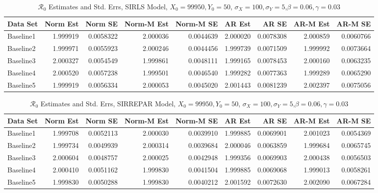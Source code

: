 \documentclass[12pt]{article}
\newcommand{\rr}{\ensuremath{\mathcal{R}_0}}
\begin{document}
\begin{table}[H]
	
	\caption{\label{tab:}$\rr$ Estimates and Std. Errs, SIRLS Model,
		$X_0 = 99950, Y_0 = 50$, $\sigma_X = 100, \sigma_Y = 5$,$\beta = 0.06, \gamma = 0.03$}
	\centering
	\begin{footnotesize}
	\begin{tabular}[t]{l|r|r|r|r|r|r|r|r}
		\hline
		Data Set & Norm Est & Norm SE & Norm-M Est & Norm-M SE & AR Est & AR SE & AR-M Est & AR-M SE\\
		\hline
		Baseline1 & 1.999919 & 0.0058322 & 2.000036 & 0.0044639 & 2.000020 & 0.0078308 & 2.000859 & 0.0060766\\
		\hline
		Baseline2 & 1.999971 & 0.0055923 & 2.000246 & 0.0044456 & 1.999739 & 0.0071509 & 1.999992 & 0.0073664\\
		\hline
		Baseline3 & 2.000327 & 0.0054549 & 1.999861 & 0.0048111 & 1.999165 & 0.0078453 & 2.000160 & 0.0063235\\
		\hline
		Baseline4 & 2.000520 & 0.0057238 & 1.999501 & 0.0046540 & 1.999282 & 0.0077363 & 1.999289 & 0.0065290\\
		\hline
		Baseline5 & 1.999919 & 0.0056334 & 2.000053 & 0.0045020 & 2.001443 & 0.0081239 & 2.002397 & 0.0075056\\
		\hline
	\end{tabular}
\end{footnotesize}
\end{table}
\begin{table}[H]
	
	\caption{\label{tab:}$\rr$ Estimates and Std. Errs, SIRREPAR Model,
		$X_0 = 99950, Y_0 = 50$, $\sigma_X = 100, \sigma_Y = 5$,$\beta = 0.06, \gamma = 0.03$}
	\centering
	\begin{footnotesize}
	\begin{tabular}[t]{l|r|r|r|r|r|r|r|r}
		\hline
		Data Set & Norm Est & Norm SE & Norm-M Est & Norm-M SE & AR Est & AR SE & AR-M Est & AR-M SE\\
		\hline
		Baseline1 & 1.999708 & 0.0052113 & 2.000030 & 0.0039910 & 1.999885 & 0.0069901 & 2.001023 & 0.0054369\\
		\hline
		Baseline2 & 1.999734 & 0.0049939 & 2.000314 & 0.0039684 & 2.000046 & 0.0063859 & 1.999684 & 0.0065745\\
		\hline
		Baseline3 & 2.000604 & 0.0048757 & 2.000025 & 0.0042948 & 1.999356 & 0.0069903 & 2.000438 & 0.0056503\\
		\hline
		Baseline4 & 2.000410 & 0.0051162 & 1.999830 & 0.0041504 & 1.999885 & 0.0069068 & 1.999013 & 0.0058261\\
		\hline
		Baseline5 & 1.999830 & 0.0050288 & 1.999830 & 0.0040212 & 2.001592 & 0.0072630 & 2.002090 & 0.0067284\\
		\hline
	\end{tabular}
\end{footnotesize}
\end{table}
\end{document}
